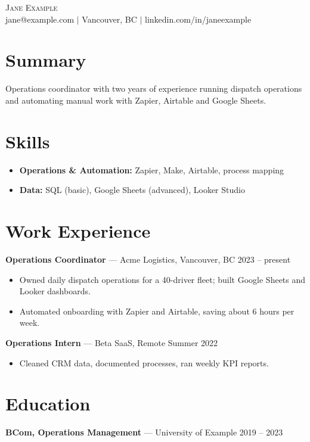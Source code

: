\documentclass[letterpaper,11pt]{article}
\begin{document}
\begin{center}{\Huge \scshape Jane Example}\\ jane@example.com $|$ Vancouver, BC $|$ linkedin.com/in/janeexample\end{center}
\section*{Summary}
Operations coordinator with two years of experience running dispatch operations and automating manual work with Zapier, Airtable and Google Sheets.
\section*{Skills}
\begin{itemize}[leftmargin=*, itemsep=0pt]
  \item \textbf{Operations \& Automation:} Zapier, Make, Airtable, process mapping
  \item \textbf{Data:} SQL (basic), Google Sheets (advanced), Looker Studio
\end{itemize}
\section*{Work Experience}
\textbf{Operations Coordinator} — Acme Logistics, Vancouver, BC \hfill 2023 -- present
\begin{itemize}[leftmargin=0.2in, itemsep=1pt]
  \item Owned daily dispatch operations for a 40-driver fleet; built Google Sheets and Looker dashboards.
  \item Automated onboarding with Zapier and Airtable, saving about 6 hours per week.
\end{itemize}
\textbf{Operations Intern} — Beta SaaS, Remote \hfill Summer 2022
\begin{itemize}[leftmargin=0.2in, itemsep=1pt]
  \item Cleaned CRM data, documented processes, ran weekly KPI reports.
\end{itemize}
\section*{Education}
\textbf{BCom, Operations Management} — University of Example \hfill 2019 -- 2023
\end{document}
